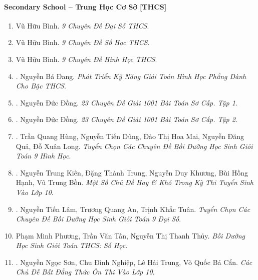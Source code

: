 \documentclass{article}
\begin{document}
\paragraph{Secondary School -- Trung Học Cơ Sở [THCS]}

\begin{enumerate}
	\item Vũ Hữu Bình. {\it 9 Chuyên Đề Đại Số THCS}.

	\item Vũ Hữu Bình. {\it 9 Chuyên Đề Số Học THCS}.

	\item Vũ Hữu Bình. {\it 9 Chuyên Đề Hình Học THCS}.

	\item \cite{Dang2018}. Nguyễn Bá Đang. {\it Phát Triển Kỹ Năng Giải Toán Hình Học Phẳng Dành Cho Bậc THCS}.\hfill{\sf[reading]}

	\item \cite{Dong_23_1001_toan_I}. Nguyễn Đức Đồng. {\it 23 Chuyên Đề Giải 1001 Bài Toán Sơ Cấp. Tập 1}.\hfill{\sf[reading]}

	\item \cite{Dong_23_1001_toan_II}. Nguyễn Đức Đồng. {\it 23 Chuyên Đề Giải 1001 Bài Toán Sơ Cấp. Tập 2}.\hfill{\sf[reading]}

	\item \cite{Hung_Dung_Mai_Qua_Long_Toan_9_hinh_hoc}. Trần Quang Hùng, Nguyễn Tiến Dũng, Đào Thị Hoa Mai, Nguyễn Đăng Quả, Đỗ Xuân Long. {\it Tuyển Chọn Các Chuyên Đề Bồi Dưỡng Học Sinh Giỏi Toán 9 Hình Học}.\hfill{\sf[reading]}

	\item \cite{Kien_Trung_Khuong_Hanh_Bon}. Nguyễn Trung Kiên, Đặng Thành Trung, Nguyễn Duy Khương, Bùi Hồng Hạnh, Vũ Trung Bồn. {\it Một Số Chủ Đề Hay \& Khó Trong Kỳ Thi Tuyển Sinh Vào Lớp 10}.\hfill{\sf[reading]}

	\item \cite{Lam_An_Tuan_Toan_9_dai_so}. Nguyễn Tiến Lâm, Trương Quang An, Trịnh Khắc Tuân. {\it Tuyển Chọn Các Chuyên Đề Bồi Dưỡng Học Sinh Giỏi Toán 9 Đại Số}.\hfill{\sf[reading]}

	\item Phạm Minh Phương, Trần Văn Tấn, Nguyễn Thị Thanh Thủy. {\it Bồi Dưỡng Học Sinh Giỏi Toán THCS: Số Học}.

	\item \cite{Son_Nghiep_Trung_Can_bdt}. Nguyễn Ngọc Sơn, Chu Đình Nghiệp, Lê Hải Trung, Võ Quốc Bá Cẩn. {\it Các Chủ Đề Bất Đẳng Thức Ôn Thi Vào Lớp 10}.\hfill{\sf[reading]}


\end{enumerate}
\end{document}
